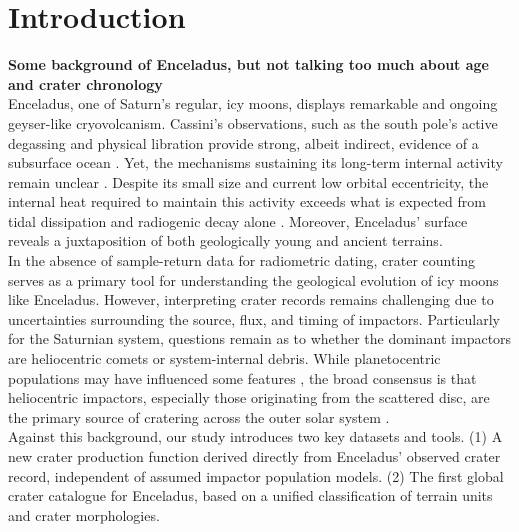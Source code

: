 \documentclass[preprint,12pt,3p,times,authoryear]{elsarticle}
\begin{document}
\linenumbers
\section{Introduction}
\label{intro}

\textbf{Some background of Enceladus, but not talking too much about age and crater chronology}\\

Enceladus, one of Saturn's regular, icy moons, displays remarkable and ongoing geyser-like cryovolcanism. Cassini’s observations, such as the south pole’s active degassing \citep{Porco2004,Spencer2006} and physical libration \citep{Thomas2016,Nimmo2023} provide strong, albeit indirect, evidence of a subsurface ocean \citep{Porco2004,Spencer2006}. Yet, the mechanisms sustaining its long-term internal activity remain unclear \citep{Nimmo2023}. Despite its small size and current low orbital eccentricity, the internal heat required to maintain this activity exceeds what is expected from tidal dissipation and radiogenic decay alone \citep{Meyer2007,Roberts2008}. Moreover, Enceladus' surface reveals a juxtaposition of both geologically young and ancient terrains.\\

In the absence of sample-return data for radiometric dating, crater counting serves as a primary tool for understanding the geological evolution of icy moons like Enceladus. However, interpreting crater records remains challenging due to uncertainties surrounding the source, flux, and timing of impactors. Particularly for the Saturnian system, questions remain as to whether the dominant impactors are heliocentric comets or system-internal debris. While planetocentric populations may have influenced some features \citep{Ferguson2022}, the broad consensus is that heliocentric impactors, especially those originating from the scattered disc, are the primary source of cratering across the outer solar system \citep{Shoemaker1982,Chapman1986,Zahnle1998,Nesvorny2019,Wong2023,Nesvorny2023}. \\

Against this background, our study introduces two key datasets and tools. (1) A new crater production function derived directly from Enceladus’ observed crater record, independent of assumed impactor population models. (2) The first global crater catalogue for Enceladus, based on a unified classification of terrain units and crater morphologies. \\
\end{document}
